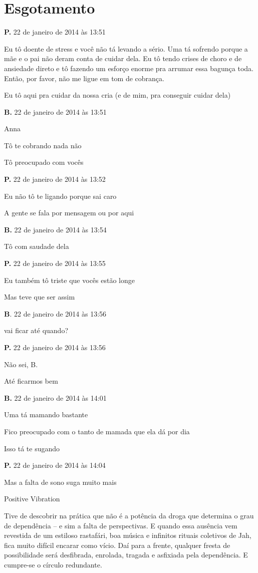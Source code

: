 \chapter{Esgotamento}

\textbf{P.} 22 de janeiro de 2014 às 13:51

Eu tô doente de stress e você não tá levando a sério. Uma tá sofrendo
porque a mãe e o pai não deram conta de cuidar dela. Eu tô tendo crises
de choro e de ansiedade direto e tô fazendo um esforço enorme pra
arrumar essa bagunça toda. Então, por favor, não me ligue em tom de
cobrança.

Eu tô aqui pra cuidar da nossa cria (e de mim, pra conseguir cuidar
dela)

\textbf{B.} 22 de janeiro de 2014 às 13:51

Anna

Tô te cobrando nada não

Tô preocupado com vocês

\textbf{P.} 22 de janeiro de 2014 às 13:52

Eu não tô te ligando porque sai caro

A gente se fala por mensagem ou por aqui

\textbf{B.} 22 de janeiro de 2014 às 13:54

Tô com saudade dela

\textbf{P.} 22 de janeiro de 2014 às 13:55

Eu também tô triste que vocês estão longe

Mas teve que ser assim

\textbf{B}. 22 de janeiro de 2014 às 13:56

vai ficar até quando?

\textbf{P.} 22 de janeiro de 2014 às 13:56

Não sei, B.

Até ficarmos bem

\textbf{B.} 22 de janeiro de 2014 às 14:01

Uma tá mamando bastante

Fico preocupado com o tanto de mamada que ela dá por dia

Isso tá te sugando

\textbf{P.} 22 de janeiro de 2014 às 14:04

Mas a falta de sono suga muito mais

Positive Vibration

Tive de descobrir na prática que não é a potência da droga que determina
o grau de dependência -- e sim a falta de perspectivas. E quando essa
ausência vem revestida de um estiloso rastafári, boa música e infinitos
rituais coletivos de Jah, fica muito difícil encarar como vício. Daí
para a frente, qualquer fresta de possibilidade será desfibrada,
enrolada, tragada e asfixiada pela dependência. E cumpre-se o círculo
redundante.

